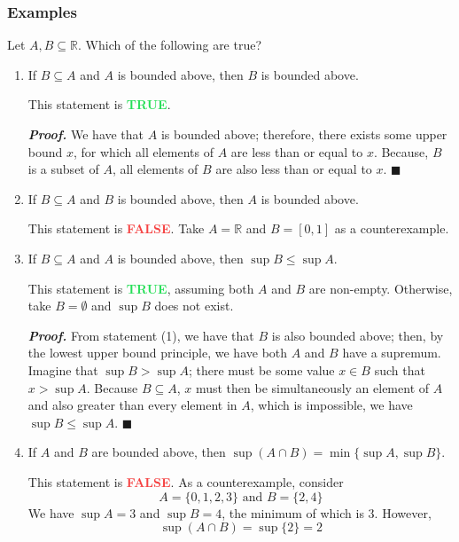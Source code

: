\documentclass[10pt]{article}
\def\R{{\mathbb R}}
\newenvironment{solution}{\begin{tcolorbox}[colframe=_grey,colback=white,arc=0pt,outer arc=0pt]}{\end{tcolorbox}}
\newcommand{\true}{\textbf{\textcolor[HTML]{26de57}{TRUE}}}
\newcommand{\false}{\textbf{\textcolor[HTML]{f54242}{FALSE}}}
\newenvironment{proof}{\par\textit{\textbf{Proof.}}}{\hfill$\blacksquare$}
\begin{document}
\subsubsection{Examples}
Let $A,B\subseteq\R$. Which of the following are true?
\begin{enumerate}
    \item If $B\subseteq A$ and $A$ is bounded above, then $B$ is bounded above.
          \begin{solution}
              This statement is \true.
              \begin{proof}
                  We have that $A$ is bounded above; therefore, there exists some upper bound $x$, for which all elements of $A$ are less than or equal to $x$. Because, $B$ is a subset of $A$, all elements of $B$ are also less than or equal to $x$.
              \end{proof}
          \end{solution}
    \item If $B\subseteq A$ and $B$ is bounded above, then $A$ is bounded above.
          \begin{solution}
              This statement is \false. Take $A=\R$ and $B=[0,1]$ as a counterexample.
          \end{solution}
    \item If $B\subseteq A$ and $A$ is bounded above, then $\sup B\leq \sup A$.
          \begin{solution}
              This statement is \true, assuming both $A$ and $B$ are non-empty. Otherwise, take $B=\emptyset$ and $\sup B$ does not exist.
              \begin{proof}
                  From statement (1), we have that $B$ is also bounded above; then, by the lowest upper bound principle, we have both $A$ and $B$ have a supremum.
                  \\ Imagine that $\sup B>\sup A$; there must be some value $x\in B$ such that $x>\sup A$. Because $B\subseteq A$, $x$ must then be simultaneously an element of $A$ and also greater than every element in $A$, which is impossible, we have $\sup B \leq \sup A$.
              \end{proof}
          \end{solution}
    \item If $A$ and $B$ are bounded above, then $\sup(A\cap B)=\min\{\sup A,\sup B\}$.
          \begin{solution}
              This statement is \false. As a counterexample, consider
              $$A=\{0,1,2,3\}\text{ and }B=\{2,4\}$$
              We have $\sup A=3$ and $\sup B=4$, the minimum of which is $3$. However,
              $$
                  \sup(A\cap B)=\sup\{2\}=2
              $$
          \end{solution}
\end{enumerate}
\end{document}
